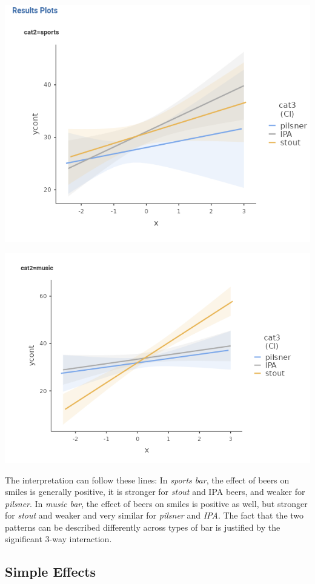 \documentclass[
]{book}
\begin{document}
\includegraphics[width=8.65in]{bookletpics/2_ancova_output4a}

\includegraphics[width=9.07in]{bookletpics/2_ancova_output4b}

The interpretation can follow these lines: In \emph{sports bar}, the effect of beers on smiles is generally positive, it is stronger for \emph{stout} and IPA beers, and weaker for \emph{pilsner}. In \emph{music bar}, the effect of beers on smiles is positive as well, but stronger for \emph{stout} and weaker and very similar for \emph{pilsner} and \emph{IPA}. The fact that the two patterns can be described differently across types of bar is justified by the significant 3-way interaction.

\hypertarget{simple-effects}{%
\subsection{Simple Effects}\label{simple-effects}}
\end{document}
